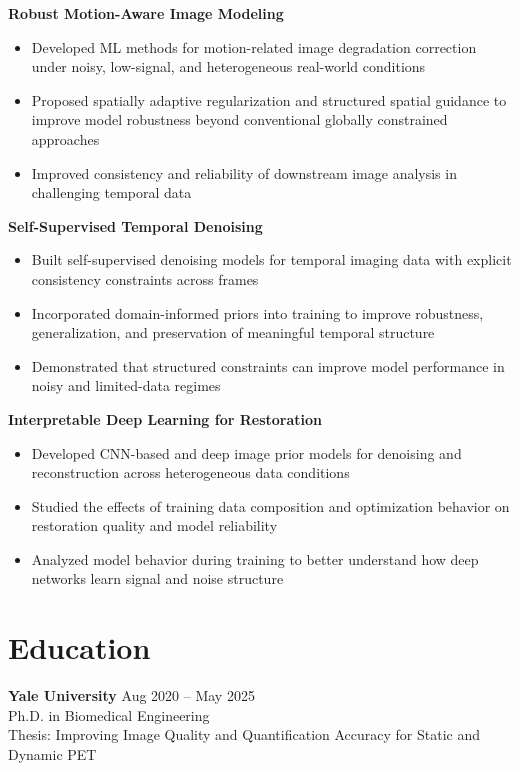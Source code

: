 \textbf{Robust Motion-Aware Image Modeling}
\begin{itemize}[leftmargin=*]
\item Developed ML methods for motion-related image degradation correction under noisy, low-signal, and heterogeneous real-world conditions
\item Proposed spatially adaptive regularization and structured spatial guidance to improve model robustness beyond conventional globally constrained approaches
\item Improved consistency and reliability of downstream image analysis in challenging temporal data
\end{itemize}

\textbf{Self-Supervised Temporal Denoising}
\begin{itemize}[leftmargin=*]
\item Built self-supervised denoising models for temporal imaging data with explicit consistency constraints across frames
\item Incorporated domain-informed priors into training to improve robustness, generalization, and preservation of meaningful temporal structure
\item Demonstrated that structured constraints can improve model performance in noisy and limited-data regimes
\end{itemize}

\textbf{Interpretable Deep Learning for Restoration}
\begin{itemize}[leftmargin=*]
\item Developed CNN-based and deep image prior models for denoising and reconstruction across heterogeneous data conditions
\item Studied the effects of training data composition and optimization behavior on restoration quality and model reliability
\item Analyzed model behavior during training to better understand how deep networks learn signal and noise structure
\end{itemize}

\section{Education}
\textbf{Yale University} \hfill Aug 2020 -- May 2025 \\
Ph.D. in Biomedical Engineering \\
Thesis: Improving Image Quality and Quantification Accuracy for Static and Dynamic PET

